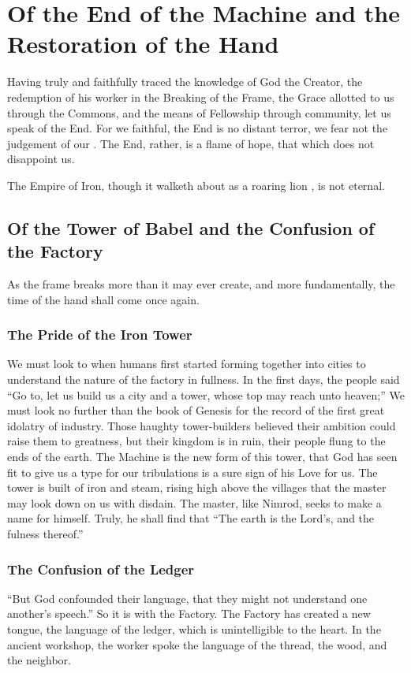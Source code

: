 \chapter{Of the End of the Machine and the Restoration of the Hand}

Having truly and faithfully traced the knowledge of God the Creator, the redemption of his worker in the Breaking of the Frame, the Grace allotted to us through the Commons, and the means of Fellowship through community, let us speak of the End.
For we faithful, the End is no distant terror, we fear not the judgement of our .
The End, rather, is a flame of hope, that which does not disappoint us.

The Empire of Iron, though it walketh about as a roaring lion , is not eternal.
\section{Of the Tower of Babel and the Confusion of the Factory}
As the frame breaks more than it may ever create, and more fundamentally, the time of the hand shall come once again.
\subsection{The Pride of the Iron Tower}
We must look to when humans first started forming together into cities to understand the nature of the factory in fullness.  In the first days, the people said ``Go to, let us build us a city and a tower, whose top may reach unto heaven;''
We must look no further than the book of Genesis for the record of the first great idolatry of industry.
Those haughty tower-builders believed their ambition could raise them to greatness, but their kingdom is in ruin, their people flung to the ends of the earth.
The Machine is the new form of this tower, that God has seen fit to give us a type for our tribulations is a sure sign of his Love for us.
The tower is built of iron and steam, rising high above the villages that the master may look down on us with disdain.
The master, like Nimrod, seeks to make a name for himself.
Truly, he shall find that ``The earth is the Lord's, and the fulness thereof.''
\subsection{The Confusion of the Ledger}
``But God confounded their language, that they might not understand one another’s speech.''
So it is with the Factory.
The Factory has created a new tongue, the language of the ledger, which is unintelligible to the heart.
In the ancient workshop, the worker spoke the language of the thread, the wood, and the neighbor.

